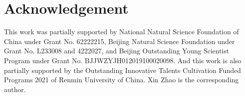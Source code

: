 \section*{Acknowledgement}
This work was partially supported by National Natural Science Foundation of China under Grant No. 62222215, Beijing Natural Science Foundation under Grant No. L233008 and 4222027, and Beijing Outstanding Young Scientist Program under Grant No. BJJWZYJH012019100020098. And this work is also partially supported by the Outstanding Innovative Talents Cultivation Funded Programs 2021 of Renmin University of China. Xin Zhao is the corresponding author.

\newpage

